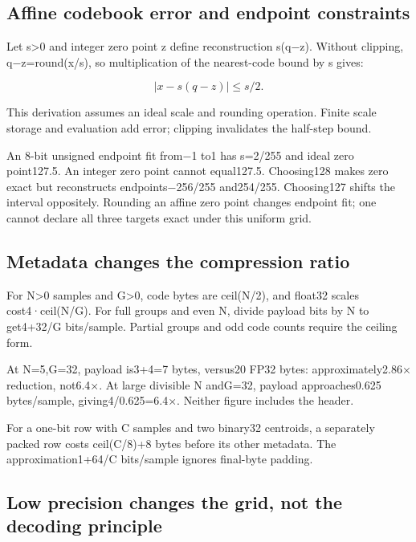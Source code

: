 \subsection{Affine codebook error and endpoint constraints}\label{01-foundations-i-ch011-affine-codebook-error-and-endpoint-constraints}

Let s\textgreater0 and integer zero point z define reconstruction s(q−z). Without clipping, q−z=round(x/s), so multiplication of the nearest-code bound by s gives:

\[
\left|x-s(q-z)\right|\le s/2.
\]

This derivation assumes an ideal scale and rounding operation. Finite scale storage and evaluation add error; clipping invalidates the half-step bound.

An 8-bit unsigned endpoint fit from−1 to1 has s=2/255 and ideal zero point127.5. An integer zero point cannot equal127.5. Choosing128 makes zero exact but reconstructs endpoints−256/255 and254/255. Choosing127 shifts the interval oppositely. Rounding an affine zero point changes endpoint fit; one cannot declare all three targets exact under this uniform grid.

\subsection{Metadata changes the compression ratio}\label{01-foundations-i-ch011-metadata-changes-the-compression-ratio}

For N\textgreater0 samples and G\textgreater0, code bytes are ceil(N/2), and float32 scales cost4·ceil(N/G). For full groups and even N, divide payload bits by N to get4+32/G bits/sample. Partial groups and odd code counts require the ceiling form.

At N=5,G=32, payload is3+4=7 bytes, versus20 FP32 bytes: approximately2.86× reduction, not6.4×. At large divisible N andG=32, payload approaches0.625 bytes/sample, giving4/0.625=6.4×. Neither figure includes the header.

For a one-bit row with C samples and two binary32 centroids, a separately packed row costs ceil(C/8)+8 bytes before its other metadata. The approximation1+64/C bits/sample ignores final-byte padding.

\subsection{Low precision changes the grid, not the decoding principle}\label{01-foundations-i-ch011-low-precision-changes-the-grid-not-the-decoding-principle}

